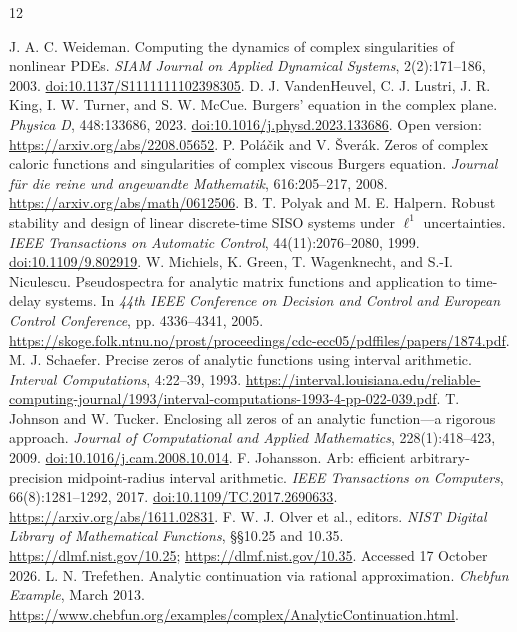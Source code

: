 \documentclass[11pt]{article}
\begin{document}
\begin{thebibliography}{12}\small\raggedright
{} J. A. C. Weideman. Computing the dynamics of complex singularities of nonlinear PDEs. \emph{SIAM Journal on Applied Dynamical Systems}, 2(2):171--186, 2003. \href{https://doi.org/10.1137/S1111111102398305}{doi:10.1137/S1111111102398305}.
 D. J. VandenHeuvel, C. J. Lustri, J. R. King, I. W. Turner, and S. W. McCue. Burgers' equation in the complex plane. \emph{Physica D}, 448:133686, 2023. \href{https://doi.org/10.1016/j.physd.2023.133686}{doi:10.1016/j.physd.2023.133686}. Open version: \url{https://arxiv.org/abs/2208.05652}.
 P. Pol\'a\v cik and V. \v Sver\'ak. Zeros of complex caloric functions and singularities of complex viscous Burgers equation. \emph{Journal f\"ur die reine und angewandte Mathematik}, 616:205--217, 2008. \url{https://arxiv.org/abs/math/0612506}.
 B. T. Polyak and M. E. Halpern. Robust stability and design of linear discrete-time SISO systems under $\ell^1$ uncertainties. \emph{IEEE Transactions on Automatic Control}, 44(11):2076--2080, 1999. \href{https://doi.org/10.1109/9.802919}{doi:10.1109/9.802919}.
 W. Michiels, K. Green, T. Wagenknecht, and S.-I. Niculescu. Pseudospectra for analytic matrix functions and application to time-delay systems. In \emph{44th IEEE Conference on Decision and Control and European Control Conference}, pp. 4336--4341, 2005. \url{https://skoge.folk.ntnu.no/prost/proceedings/cdc-ecc05/pdffiles/papers/1874.pdf}.
 M. J. Schaefer. Precise zeros of analytic functions using interval arithmetic. \emph{Interval Computations}, 4:22--39, 1993. \url{https://interval.louisiana.edu/reliable-computing-journal/1993/interval-computations-1993-4-pp-022-039.pdf}.
 T. Johnson and W. Tucker. Enclosing all zeros of an analytic function---a rigorous approach. \emph{Journal of Computational and Applied Mathematics}, 228(1):418--423, 2009. \href{https://doi.org/10.1016/j.cam.2008.10.014}{doi:10.1016/j.cam.2008.10.014}.
 F. Johansson. Arb: efficient arbitrary-precision midpoint-radius interval arithmetic. \emph{IEEE Transactions on Computers}, 66(8):1281--1292, 2017. \href{https://doi.org/10.1109/TC.2017.2690633}{doi:10.1109/TC.2017.2690633}. \url{https://arxiv.org/abs/1611.02831}.
 F. W. J. Olver et al., editors. \emph{NIST Digital Library of Mathematical Functions}, \S\S10.25 and 10.35. \url{https://dlmf.nist.gov/10.25}; \url{https://dlmf.nist.gov/10.35}. Accessed 17 October 2026.
 L. N. Trefethen. Analytic continuation via rational approximation. \emph{Chebfun Example}, March 2013. \url{https://www.chebfun.org/examples/complex/AnalyticContinuation.html}.
\end{thebibliography}
\end{document}
